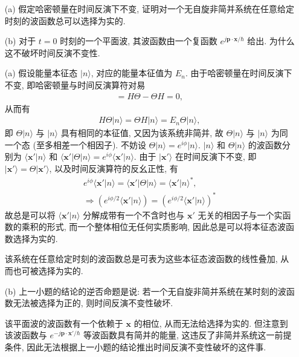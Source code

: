 \documentclass{assignment}
\begin{document}
\begin{prob}[课本习题 4.8]
    \begin{itemize}
        \item[(a)] 假定哈密顿量在时间反演下不变, 证明对一个无自旋非简并系统在任意给定时刻的波函数总可以选择为实的.
        \item[(b)] 对于 $t=0$ 时刻的一个平面波, 其波函数由一个复函数 $e^{j\bm{p}\cdot\bm{x}/\hbar}$ 给出. 为什么这不破坏时间反演不变性.
    \end{itemize}
\end{prob}
\begin{pf}
    \begin{itemize}
        \item[(a)] 假设能量本征态 $\lvert n\rangle$, 对应的能量本征值为 $E_n$. 由于哈密顿量在时间反演下不变, 即哈密顿量与时间反演算符对易
        \begin{align}
            [H,\Theta]=H\Theta-\Theta H=0,
        \end{align}
        从而有
        \begin{align}
            H\Theta\lvert n\rangle=\Theta H\lvert n\rangle=E_n\Theta\lvert n\rangle,
        \end{align}
        即 $\Theta\lvert n\rangle$ 与 $\lvert n\rangle$ 具有相同的本征值, 又因为该系统非简并, 故 $\Theta\lvert n\rangle$ 与 $\lvert n\rangle$ 为同一个态 (至多相差一个相因子).
        不妨设 $\Theta\lvert n\rangle=e^{i\phi}\lvert n\rangle$.
        $\lvert n\rangle$ 和 $\Theta\lvert n\rangle$ 的波函数分别为 $\langle\bm{x}'\vert n\rangle$ 和 $\langle\bm{x}'\rvert\Theta\lvert n\rangle=e^{i\phi}\langle\bm{x}'\vert n\rangle$.
        由于 $\lvert\bm{x}'\rangle$ 在时间反演下不变, 即 $\lvert\bm{x}'\rangle=\Theta\lvert\bm{x}'\rangle$, 以及时间反演算符的反幺正性, 有
        \begin{gather}
            e^{i\phi}\langle\bm{x}'\vert n\rangle=\langle\bm{x}'\rvert\Theta\lvert n\rangle=\langle\bm{x}'\vert n\rangle^*,\\
            \Longrightarrow(e^{i\phi/2}\langle\bm{x}'\vert n\rangle)=(e^{i\phi/2}\langle\bm{x}'\rvert n\rangle)^*
        \end{gather}
        故总是可以将 $\langle\bm{x}'\vert n\rangle$ 分解成带有一个不含时也与 $\bm{x}'$ 无关的相因子与一个实函数的乘积的形式, 而一个整体相位无任何实质影响, 因此总是可以将本征态波函数选择为实的.

        该系统在任意给定时刻的波函数总是可表为这些本征态波函数的线性叠加, 从而也可被选择为实的.
        \item[(b)] 上一小题的结论的逆否命题是说: 若一个无自旋非简并系统在某时刻的波函数无法被选择为正的, 则时间反演不变性破坏.

        该平面波的波函数有一个依赖于 $\bm{x}$ 的相位, 从而无法给选择为实的.
        但注意到该波函数与 $e^{-j\bm{p}\cdot\bm{x}'/\hbar}$ 等波函数具有简并的能量, 这违反了非简并系统这一前提条件, 因此无法根据上一小题的结论推出时间反演不变性破坏的这件事.
    \end{itemize}
\end{pf}
\end{document}
